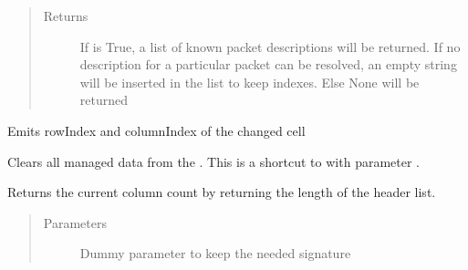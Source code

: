 \documentclass[letterpaper,10pt,english]{sphinxmanual}
\begin{document}
\begin{fulllineitems}
\begin{fulllineitems}
\begin{quote}
\begin{description}
\begin{itemize}
\end{itemize}

\item[{Returns}] \leavevmode
If  is True, a list of known packet descriptions will be returned. If no
description for a particular packet can be resolved, an empty string will be inserted in the list
to keep indexes. Else None will be returned

\end{description}\end{quote}

\end{fulllineitems}


\begin{fulllineitems}
\label{\detokenize{src:src.PacketTableModel.PacketTableModel.cellChanged}}
Emits rowIndex and columnIndex of the changed cell

\end{fulllineitems}


\begin{fulllineitems}
\label{\detokenize{src:src.PacketTableModel.PacketTableModel.clear}}
Clears all managed data from the .
This is a shortcut to {\hyperref[\detokenize{src:src.PacketTableModel.PacketTableModel.setRowCount}]{}} with parameter .

\end{fulllineitems}


\begin{fulllineitems}
\label{\detokenize{src:src.PacketTableModel.PacketTableModel.columnCount}}
Returns the current column count by returning the length of the header list.
\begin{quote}\begin{description}
\item[{Parameters}] \leavevmode
{} \textendash{} Dummy parameter to keep the needed signature


\end{description}
\end{quote}
\end{fulllineitems}
\end{fulllineitems}
\end{document}
